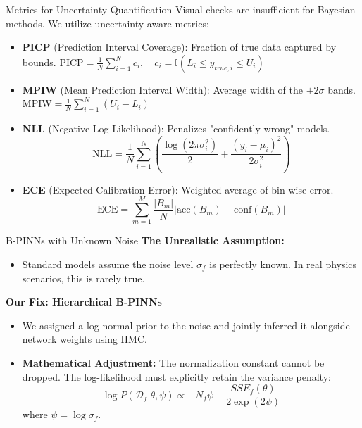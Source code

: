 \documentclass[10pt, aspectratio=169]{beamer}
\begin{document}
\begin{frame}{Metrics for Uncertainty Quantification}
    Visual checks are insufficient for Bayesian methods. We utilize uncertainty-aware metrics:
    \begin{itemize}
        \item \textbf{PICP} (Prediction Interval Coverage): Fraction of true data captured by bounds.
        $\text{PICP} = \frac{1}{N} \sum_{i=1}^{N} c_i, \quad c_i = \mathbb{I}(L_i \le y_{true, i} \le U_i)$
        \item \textbf{MPIW} (Mean Prediction Interval Width): Average width of the $\pm 2\sigma$ bands.
        $\text{MPIW} = \frac{1}{N} \sum_{i=1}^{N} (U_i - L_i)$
        \item \textbf{NLL} (Negative Log-Likelihood): Penalizes "confidently wrong" models.
        \[ \text{NLL} = \frac{1}{N} \sum_{i=1}^{N} \left( \frac{\log(2\pi\sigma_i^2)}{2} + \frac{(y_i - \mu_i)^2}{2\sigma_i^2} \right) \]
        \item \textbf{ECE} (Expected Calibration Error): Weighted average of bin-wise error.
        \[ \text{ECE} = \sum_{m=1}^{M} \frac{|B_m|}{N} \left| \text{acc}(B_m) - \text{conf}(B_m) \right| \]
    \end{itemize}
\end{frame}

\begin{frame}{B-PINNs with Unknown Noise}
    \textbf{The Unrealistic Assumption:}
    \begin{itemize}
        \item Standard models assume the noise level $\sigma_f$ is perfectly known. In real physics scenarios, this is rarely true.
    \end{itemize}
    \vspace{0.3cm}
    \textbf{Our Fix: Hierarchical B-PINNs}
    \begin{itemize}
        \item We assigned a log-normal prior to the noise and jointly inferred it alongside network weights using HMC.
        \item \textbf{Mathematical Adjustment:} The normalization constant cannot be dropped. The log-likelihood must explicitly retain the variance penalty:
        $$ \log P(\mathcal{D}_f | \theta, \psi) \propto -N_f \psi - \frac{SSE_f(\theta)}{2 \exp(2\psi)} $$
        where $\psi = \log \sigma_f$.
    \end{itemize}
\end{frame}
\end{document}
